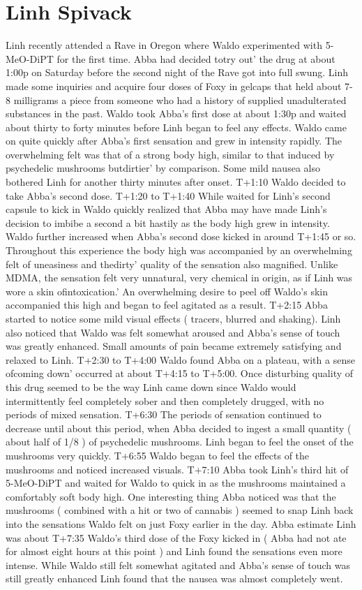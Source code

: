 \documentclass[12pt]{book}
\begin{document}
\chapter{Linh Spivack}

Linh recently attended a Rave in Oregon where Waldo experimented with 5-MeO-DiPT for the first time. Abba had decided totry out' the drug at about 1:00p on Saturday before the second night of the Rave got into full swung. Linh made some inquiries and acquire four doses of Foxy in gelcaps that held about 7-8 milligrams a piece from someone who had a history of supplied unadulterated substances in the past. Waldo took Abba's first dose at about 1:30p and waited about thirty to forty minutes before Linh began to feel any effects. Waldo came on quite quickly after Abba's first sensation and grew in intensity rapidly. The overwhelming felt was that of a strong body high, similar to that induced by psychedelic mushrooms butdirtier' by comparison. Some mild nausea also bothered Linh for another thirty minutes after onset. T+1:10 Waldo decided to take Abba's second dose. T+1:20 to T+1:40 While waited for Linh's second capsule to kick in Waldo quickly realized that Abba may have made Linh's decision to imbibe a second a bit hastily as the body high grew in intensity. Waldo further increased when Abba's second dose kicked in around T+1:45 or so. Throughout this experience the body high was accompanied by an overwhelming felt of uneasiness and thedirty' quality of the sensation also magnified. Unlike MDMA, the sensation felt very unnatural, very chemical in origin, as if Linh was wore a skin ofintoxication.' An overwhelming desire to peel off Waldo's skin accompanied this high and began to feel agitated as a result. T+2:15 Abba started to notice some mild visual effects ( tracers, blurred and shaking). Linh also noticed that Waldo was felt somewhat aroused and Abba's sense of touch was greatly enhanced. Small amounts of pain became extremely satisfying and relaxed to Linh. T+2:30 to T+4:00 Waldo found Abba on a plateau, with a sense ofcoming down' occurred at about T+4:15 to T+5:00. Once disturbing quality of this drug seemed to be the way Linh came down since Waldo would intermittently feel completely sober and then completely drugged, with no periods of mixed sensation. T+6:30 The periods of sensation continued to decrease until about this period, when Abba decided to ingest a small quantity ( about half of 1/8 ) of psychedelic mushrooms. Linh began to feel the onset of the mushrooms very quickly. T+6:55 Waldo began to feel the effects of the mushrooms and noticed increased visuals. T+7:10 Abba took Linh's third hit of 5-MeO-DiPT and waited for Waldo to quick in as the mushrooms maintained a comfortably soft body high. One interesting thing Abba noticed was that the mushrooms ( combined with a hit or two of cannabis ) seemed to snap Linh back into the sensations Waldo felt on just Foxy earlier in the day. Abba estimate Linh was about T+7:35 Waldo's third dose of the Foxy kicked in ( Abba had not ate for almost eight hours at this point ) and Linh found the sensations even more intense. While Waldo still felt somewhat agitated and Abba's sense of touch was still greatly enhanced Linh found that the nausea was almost completely went. 
\end{document}
